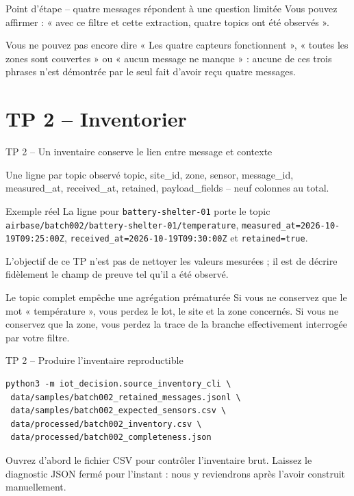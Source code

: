 \documentclass[aspectratio=169]{beamer}
\begin{document}
\begin{frame}{Point d'étape -- quatre messages répondent à une question limitée}
Vous pouvez affirmer : « avec ce filtre et cette extraction, quatre topics ont été observés ».
\begin{alertblock}{Vous ne pouvez pas encore dire}
« Les quatre capteurs fonctionnent », « toutes les zones sont couvertes » ou « aucun message ne manque » : aucune de ces trois phrases n'est démontrée par le seul fait d'avoir reçu quatre messages.
\end{alertblock}
\end{frame}

\section{TP 2 -- Inventorier}
\begin{frame}{TP 2 -- Un inventaire conserve le lien entre message et contexte}
\begin{block}{Une ligne par topic observé}
topic, site\_id, zone, sensor, message\_id, measured\_at, received\_at, retained, payload\_fields -- neuf colonnes au total.
\end{block}
\begin{exampleblock}{Exemple réel}
La ligne pour \texttt{battery-shelter-01} porte le topic \texttt{airbase/batch002/battery-shelter-01/temperature}, \texttt{measured\_at=2026-10-19T09:25:00Z}, \texttt{received\_at=2026-10-19T09:30:00Z} et \texttt{retained=true}.
\end{exampleblock}
L'objectif de ce TP n'est pas de nettoyer les valeurs mesurées ; il est de décrire fidèlement le champ de preuve tel qu'il a été observé.
\end{frame}

\begin{frame}{Le topic complet empêche une agrégation prématurée}
Si vous ne conservez que le mot « température », vous perdez le lot, le site et la zone concernés. Si vous ne conservez que la zone, vous perdez la trace de la branche effectivement interrogée par votre filtre.
\end{frame}

\begin{frame}[fragile]{TP 2 -- Produire l'inventaire reproductible}
\scriptsize
\begin{verbatim}
python3 -m iot_decision.source_inventory_cli \
 data/samples/batch002_retained_messages.jsonl \
 data/samples/batch002_expected_sensors.csv \
 data/processed/batch002_inventory.csv \
 data/processed/batch002_completeness.json
\end{verbatim}
Ouvrez d'abord le fichier CSV pour contrôler l'inventaire brut. Laissez le diagnostic JSON fermé pour l'instant : nous y reviendrons après l'avoir construit manuellement.
\end{frame}
\end{document}
